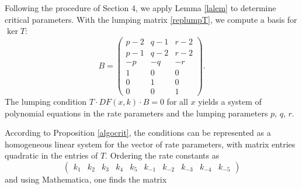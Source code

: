 \documentclass{article}
\begin{document}
Following the procedure of Section 4, we apply Lemma \ref{lalem} to determine critical 
parameters. With the lumping matrix \eqref{replumpT}, we compute a basis for $\ker T$:
\[
B = \begin{pmatrix}
p-2 & q-1 & r-2 \\
p-1 & q-2 & r-2 \\
-p & -q & -r \\
1 & 0 & 0 \\
0 & 1 & 0 \\
0 & 0 & 1
\end{pmatrix}.
\]
The lumping condition $T \cdot DF(x,k) \cdot B = 0$ for all $x$ yields a system of 
polynomial equations in the rate parameters and the lumping parameters $p$, $q$, $r$.

According to Proposition \ref{algocrit}, the conditions can be represented as a homogeneous linear system for the vector of rate parameters, with matrix entries quadratic in the entries of $T$. Ordering the rate constants as 
\[
\begin{pmatrix}
    k_1&k_2&k_3&k_4&k_5&k_{-1}&k_{-2}&k_{-3}&k_{-4}&k_{-5}
\end{pmatrix}
\]
and using {\sc Mathematica}\texttrademark, one finds the matrix
\end{document}
